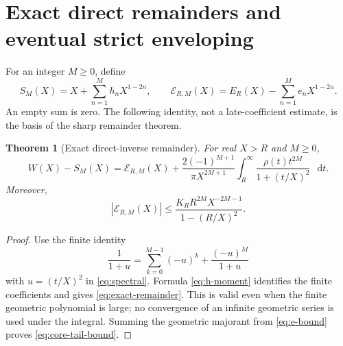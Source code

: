 \documentclass[11pt,a4paper]{article}
\newtheorem{theorem}{Theorem}[section]
\theoremstyle{definition}
\numberwithin{equation}{section}
\newcommand{\dd}{\mathop{}\!\mathrm{d}}
\begin{document}
\section{Exact direct remainders and eventual strict enveloping}
\label{sec:remainder}

For an integer $M\ge0$, define
\begin{equation}
 S_M(X)=X+\sum_{n=1}^M h_nX^{1-2n},\qquad
 \mathcal E_{R,M}(X)=E_R(X)-\sum_{n=1}^M e_nX^{1-2n}.
 \label{eq:partial-sums}
\end{equation}
An empty sum is zero. The following identity, not a late-coefficient estimate, is the basis of the sharp remainder theorem.

\begin{theorem}[Exact direct-inverse remainder]
\label{thm:remainder}
For real $X>R$ and $M\ge0$,
\begin{equation}
 W(X)-S_M(X)=\mathcal E_{R,M}(X)
 +\frac{2(-1)^{M+1}}{\pi X^{2M+1}}
       \int_R^\infty\frac{\rho(t)t^{2M}}{1+(t/X)^2}\,\dd t.
 \label{eq:exact-remainder}
\end{equation}
Moreover,
\begin{equation}
 |\mathcal E_{R,M}(X)|\le
 \frac{K_R R^{2M}X^{-2M-1}}{1-(R/X)^2}.
 \label{eq:core-tail-bound}
\end{equation}
\end{theorem}
\begin{proof}
Use the finite identity
\[
 \frac1{1+u}=\sum_{k=0}^{M-1}(-u)^k+\frac{(-u)^M}{1+u}
\]
with $u=(t/X)^2$ in \eqref{eq:spectral}. Formula \eqref{eq:h-moment} identifies the finite coefficients and gives \eqref{eq:exact-remainder}. This is valid even when the finite geometric polynomial is large; no convergence of an infinite geometric series is used under the integral. Summing the geometric majorant from \eqref{eq:e-bound} proves \eqref{eq:core-tail-bound}.
\end{proof}
\end{document}
